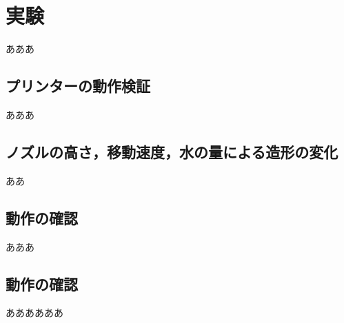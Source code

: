 \chapter{実験}
\label{chp:first}

あああ

\section{プリンターの動作検証}
\label{sec:paragraph}

あああ

\section{ノズルの高さ，移動速度，水の量による造形の変化}
\label{sec:paragraph}

ああ

\section{動作の確認}
\label{sec:paragraph}

あああ

\section{動作の確認}
\label{sec:paragraph}


ああああああ
